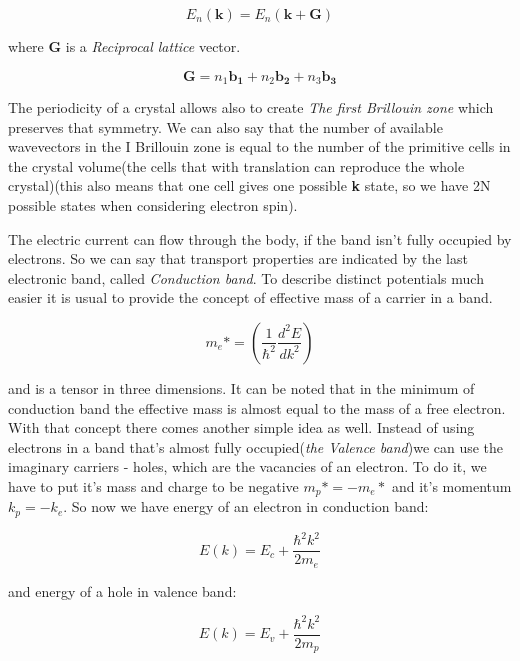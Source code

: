 \begin{equation}
E_n(\mathbf{k})=E_n(\mathbf{k}+\mathbf{G})
\end{equation}

where \textbf{G} is a \textit{Reciprocal lattice} vector. 

\begin{equation}
\mathbf{G} = n_1\mathbf{b_1} + n_2\mathbf{b_2}+ n_3\mathbf{b_3}
\end{equation}

The periodicity of a crystal allows also to create \textit{The first Brillouin zone} which preserves that symmetry. We can also say that the number of available wavevectors in the I Brillouin zone is equal to the number of the primitive cells in the crystal volume(the cells that with translation can reproduce the whole crystal)(this also means that one cell gives one possible \textbf{k} state, so we have 2N possible states when considering electron spin).

The electric current can flow through the body, if the band isn't fully occupied by electrons. So we can say  that transport properties are indicated by the last electronic band, called \textit{Conduction band}. To describe distinct potentials much easier it is usual to provide the concept of effective mass of a carrier in a band. 

\begin{equation}
m_e* = \left( \frac{1}{\hbar ^2}\frac{d^2 E}{dk^2}\right)
\end{equation}

and is a tensor in three dimensions. It can be noted that in the minimum of conduction band the effective mass is almost equal to the mass of a free electron. With that concept there comes another simple idea as well. Instead of using electrons in a band that's almost fully occupied(\textit{the Valence band})we can use the imaginary carriers - holes, which are the vacancies of an electron. To do it, we have to put it's mass and charge to be negative $ m_p * = -m_e * $ and it's momentum $k_p = - k_e$. So now we have energy of an electron in conduction band:

\begin{equation}
E(k) = E_c + \frac{\hbar ^2 k^2}{2m_e}
\end{equation}

and energy of a hole in valence band:

\begin{equation}
E(k) = E_v + \frac{\hbar ^2 k^2}{2m_p}
\end{equation}

